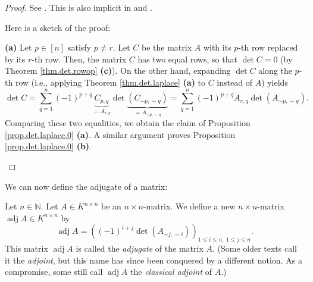 \begin{proof}
See \cite[Proposition 6.96]{detnotes}. This is also implicit in \cite[proof of
Proposition B.28]{Strick13} and \cite[proof of Theorem 9.50]{Loehr-BC}.
\medskip

\begin{fineprint}
Here is a sketch of the proof:

\textbf{(a)} Let $p\in\left[  n\right]  $ satisfy $p\neq r$. Let $C$ be the
matrix $A$ with its $p$-th row replaced by its $r$-th row. Then, the matrix
$C$ has two equal rows, so that $\det C=0$ (by Theorem \ref{thm.det.rowop}
\textbf{(c)}). On the other hand, expanding $\det C$ along the $p$-th row
(i.e., applying Theorem \ref{thm.det.laplace} \textbf{(a)} to $C$ instead of
$A$) yields%
\[
\det C=\sum_{q=1}^{n}\left(  -1\right)  ^{p+q}\underbrace{C_{p,q}}_{=A_{r,q}%
}\det\underbrace{\left(  C_{\sim p,\sim q}\right)  }_{=A_{\sim p,\sim q}}%
=\sum_{q=1}^{n}\left(  -1\right)  ^{p+q}A_{r,q}\det\left(  A_{\sim p,\sim
q}\right)  .
\]
Comparing these two equalities, we obtain the claim of Proposition
\ref{prop.det.laplace.0} \textbf{(a)}. A similar argument proves Proposition
\ref{prop.det.laplace.0} \textbf{(b)}.
\end{fineprint}
\end{proof}

We can now define the adjugate of a matrix:

\begin{definition}
\label{def.det.adj}Let $n\in\mathbb{N}$. Let $A\in K^{n\times n}$ be an
$n\times n$-matrix. We define a new $n\times n$-matrix $\operatorname*{adj}%
A\in K^{n\times n}$ by%
\[
\operatorname*{adj}A=\left(  \left(  -1\right)  ^{i+j}\det\left(  A_{\sim
j,\sim i}\right)  \right)  _{1\leq i\leq n,\ 1\leq j\leq n}.
\]
This matrix $\operatorname*{adj}A$ is called the \emph{adjugate} of the matrix
$A$. (Some older texts call it the \emph{adjoint}, but this name has since
been conquered by a different notion. As a compromise, some still call
$\operatorname*{adj}A$ the \emph{classical adjoint} of $A$.)
\end{definition}

